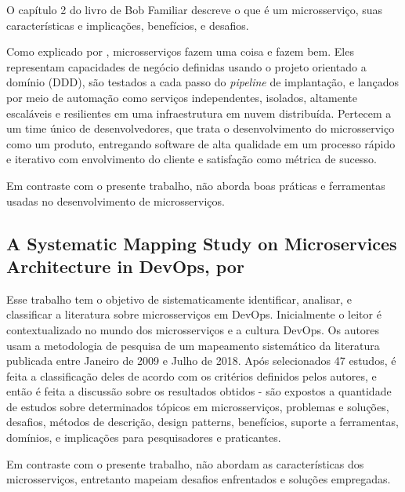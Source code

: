 O capítulo 2 do livro de Bob Familiar descreve o que é um microsserviço, suas características e implicações, benefícios, e desafios. 

Como explicado por , microsserviços fazem uma coisa e fazem bem. Eles representam capacidades de negócio definidas usando o projeto orientado a domínio (DDD), são testados a cada passo do \emph{pipeline} de implantação, e lançados por meio de automação como serviços independentes, isolados, altamente escaláveis e resilientes em uma infraestrutura em nuvem distribuída. Pertecem a um time único de desenvolvedores, que trata o desenvolvimento do microsserviço como um produto, entregando software de alta qualidade em um processo rápido e iterativo com envolvimento do cliente e satisfação como métrica de sucesso.

Em contraste com o presente trabalho,  não aborda boas práticas e ferramentas usadas no desenvolvimento de microsserviços.

\subsection{A Systematic Mapping Study on Microservices Architecture in DevOps, por }

Esse trabalho tem o objetivo de sistematicamente identificar, analisar, e classificar a literatura sobre microsserviços em DevOps. Inicialmente o leitor é contextualizado no mundo dos microsserviços e a cultura DevOps. Os autores usam a metodologia de pesquisa de um mapeamento sistemático da literatura publicada entre Janeiro de 2009 e Julho de 2018. Após selecionados 47 estudos, é feita a classificação deles de acordo com os critérios definidos pelos autores, e então é feita a discussão sobre os resultados obtidos - são expostos a quantidade de estudos sobre determinados tópicos em microsserviços, problemas e soluções, desafios, métodos de descrição, design patterns, benefícios, suporte a ferramentas, domínios, e implicações para pesquisadores e praticantes.

Em contraste com o presente trabalho,  não abordam as características dos microsserviços, entretanto mapeiam desafios enfrentados e soluções
empregadas.


